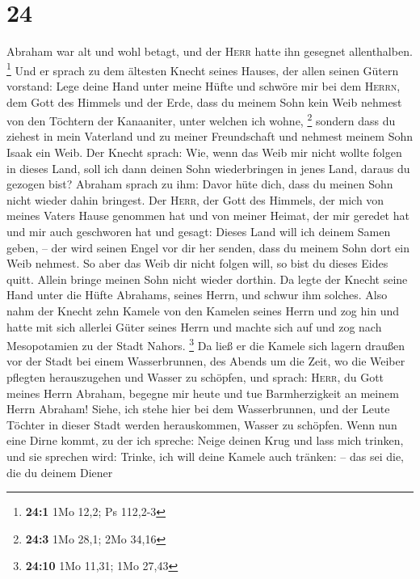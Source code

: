 \hypertarget{section-5}{%
\section{24}\label{section-5}}

 Abraham war alt und wohl betagt, und der \textsc{Herr}
hatte ihn gesegnet allenthalben. \footnote{\textbf{24:1} 1Mo 12,2; Ps
  112,2-3}  Und er sprach zu dem ältesten Knecht seines
Hauses, der allen seinen Gütern vorstand: Lege deine Hand unter meine
Hüfte  und schwöre mir bei dem \textsc{Herrn}, dem Gott
des Himmels und der Erde, dass du meinem Sohn kein Weib nehmest von den
Töchtern der Kanaaniter, unter welchen ich wohne, \footnote{\textbf{24:3}
  1Mo 28,1; 2Mo 34,16}  sondern dass du ziehest in mein
Vaterland und zu meiner Freundschaft und nehmest meinem Sohn Isaak ein
Weib.  Der Knecht sprach: Wie, wenn das Weib mir nicht
wollte folgen in dieses Land, soll ich dann deinen Sohn wiederbringen in
jenes Land, daraus du gezogen bist?  Abraham sprach zu
ihm: Davor hüte dich, dass du meinen Sohn nicht wieder dahin bringest.
 Der \textsc{Herr}, der Gott des Himmels, der mich von
meines Vaters Hause genommen hat und von meiner Heimat, der mir geredet
hat und mir auch geschworen hat und gesagt: Dieses Land will ich deinem
Samen geben, -- der wird seinen Engel vor dir her senden, dass du meinem
Sohn dort ein Weib nehmest.  So aber das Weib dir nicht
folgen will, so bist du dieses Eides quitt. Allein bringe meinen Sohn
nicht wieder dorthin.  Da legte der Knecht seine Hand
unter die Hüfte Abrahams, seines Herrn, und schwur ihm solches.
 Also nahm der Knecht zehn Kamele von den Kamelen seines
Herrn und zog hin und hatte mit sich allerlei Güter seines Herrn und
machte sich auf und zog nach Mesopotamien zu der Stadt Nahors.
\footnote{\textbf{24:10} 1Mo 11,31; 1Mo 27,43}  Da ließ
er die Kamele sich lagern draußen vor der Stadt bei einem Wasserbrunnen,
des Abends um die Zeit, wo die Weiber pflegten herauszugehen und Wasser
zu schöpfen,  und sprach: \textsc{Herr}, du Gott meines
Herrn Abraham, begegne mir heute und tue Barmherzigkeit an meinem Herrn
Abraham!  Siehe, ich stehe hier bei dem Wasserbrunnen,
und der Leute Töchter in dieser Stadt werden herauskommen, Wasser zu
schöpfen.  Wenn nun eine Dirne kommt, zu der ich spreche:
Neige deinen Krug und lass mich trinken, und sie sprechen wird: Trinke,
ich will deine Kamele auch tränken: -- das sei die, die du deinem Diener
